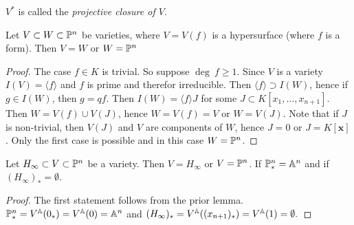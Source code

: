     \begin{remark}
        $V^\ast$ is called the \textit{projective closure of $V$}.
    \end{remark}
    \begin{lemma}
        Let $V\subset W\subset \mathbb{P}^n$ be varieties, where $V=V(f)$ is a hypersurface (where $f$ is a form). Then $V=W$ or $W=\mathbb{P}^n$
    \end{lemma}
    \begin{proof}
        The case $f\in K$ is trivial. So suppose $\deg \ f \geq 1$. Since $V$ is a variety $I(V)=\langle f\rangle$ and $f$ is prime and therefor irreducible. Then $\langle f\rangle \supset I(W)$, hence if $g\in I(W)$, then $g=qf$. Then $I(W)=\langle f\rangle J$ for some $J\subset K[x_1,\dots,x_{n+1}]$. Then $W=V(f)\cup V(J)$, hence $W=V(f)=V$ or $W=V(J)$. Note that if $J$ is non-trivial, then $V(J)$ and $V$ are components of $W$, hence $J=0$ or $J=K[\mathbf{x}]$. Only the first case is possible and in this case $W= \mathbb{P}^n$.
    \end{proof}
    \begin{lemma}
        Let $H_\infty \subset V \subset \mathbb{P}^n$ be a variety. Then $V=H_\infty$ or $V=\mathbb{P}^n$. If $\mathbb{P}^n_\ast = \mathbb{A}^n$ and if $(H_\infty)_\ast = \emptyset$.
    \end{lemma}
    \begin{proof}
        The first statement follows from the prior lemma. $\mathbb{P}^n_\ast = V^{\mathbb{A}}(0_\ast)= V^{\mathbb{A}}(0)=\mathbb{A}^n$ and $(H_\infty)_\ast = V^{\mathbb{A}}((x_{n+1})_\ast)=V^{\mathbb{A}}(1)=\emptyset.$
    \end{proof}
